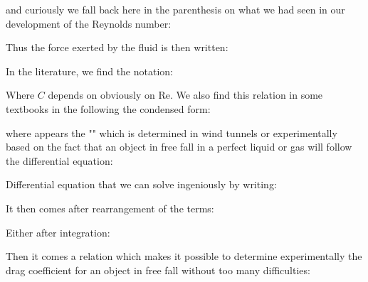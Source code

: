 	and curiously we fall back here in the parenthesis on what we had seen in our development of the Reynolds number:
		
	Thus the force exerted by the fluid is then written:
		
	In the literature, we find the notation:
	
	Where $C$ depends on obviously on Re. We also find this relation in some textbooks in the following the condensed form:
	
	where appears the "" which is determined in wind tunnels or experimentally based on the fact that an object in free fall in a perfect liquid or gas will follow the differential equation:
	
	Differential equation that we can solve ingeniously by writing:
	
	It then comes after rearrangement of the terms:
	
	Either after integration:
	
	Then it comes a relation which makes it possible to determine experimentally the drag coefficient for an object in free fall without too many difficulties:
	
